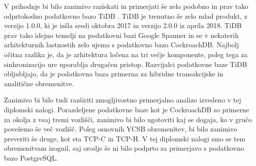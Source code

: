 \documentclass[a4paper, 12pt]{book}
\begin{document}
V prihodnje bi bilo zanimivo raziskati in primerjati še zelo podobno in prav tako odprtokodno podatkovno bazo TiDB \cite{PingCAP-home}. TiDB je trenutno še zelo mlad produkt, z verzijo 1.0.0, ki je izšla sredi oktobra 2017 in verzijo 2.0.0 iz aprila 2018. TiDB prav tako idejno temelji na podatkovni bazi Google Spanner in se v nekaterih arhitekturnih lastnostih zelo ujema s podatkovno bazo CockroachDB. Najbolj očitna razlika je, da je arhitektura ločena na tri večje komponente, poleg tega za sinhronizacijo ure uporablja drugačen pristop. Razvijalci podatkovne baze TiDB obljubljajo, da je podatkovna baza primerna za hibridne transakcijske in analitične obremenitve.

Zanimivo bi bilo tudi razširiti zmogljivostno primerjalno analizo izvedeno v tej diplomski nalogi. Porazdeljene podatkovne baze kot je CockroachDB so primerne za okolja z vsaj tremi vozlišči, zanimivo bi bilo ugotoviti kaj se dogaja, ko v gručo povežemo še več vozlišč. Poleg osnovnih YCSB obremenitev, bi bilo zanimivo preveriti še druge, kot sta TCP-C in TCP-H. V tej diplomski nalogi smo se tem obremenitvam izognil, saj orodje \cite{cockroachdb/loadgen} še ni bilo podprto za primerjavo s podatkovno bazo PostgreSQL.


\newpage %
\ \\
\clearpage
{}


\end{document}
